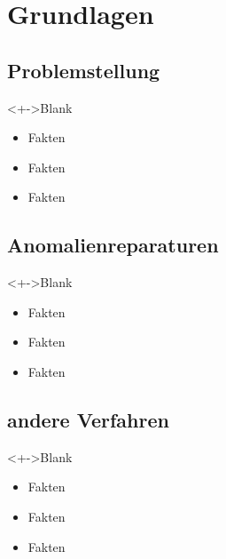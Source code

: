 \section{Grundlagen}

\subsection{Problemstellung}

\begin{frame}{\insertsubsection}
  \begin{block}<+->{Blank}
    \begin{itemize}
      \item Fakten
      \item Fakten
      \item Fakten \cite{zhang17}
    \end{itemize}
  \end{block}
\end{frame}

\subsection{Anomalienreparaturen}

\begin{frame}{\insertsubsection}
  \begin{block}<+->{Blank}
    \begin{itemize}
      \item Fakten
      \item Fakten
      \item Fakten \cite{zhang17}
    \end{itemize}
  \end{block}
\end{frame}

\subsection{andere Verfahren}

\begin{frame}{\insertsubsection}
  \begin{block}<+->{Blank}
    \begin{itemize}
      \item Fakten
      \item Fakten
      \item Fakten
    \end{itemize}
  \end{block}
\end{frame}
